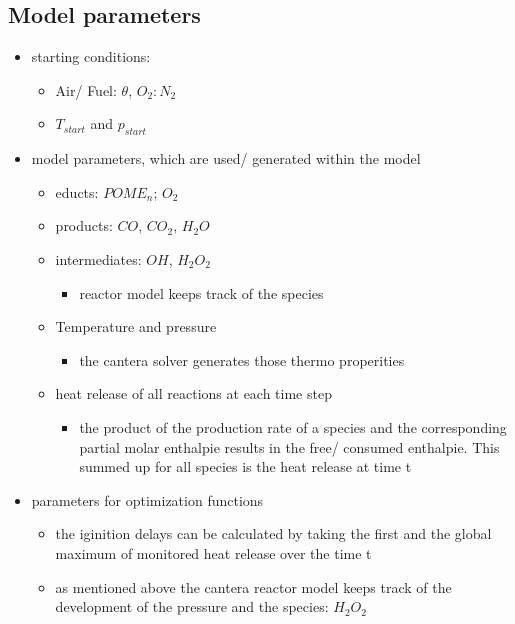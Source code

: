 \documentclass[12pt,oneside,a4paper,english]{article}
\begin{document}
\subsection{Model parameters} %
\begin{itemize}
\item{starting conditions:}

	\begin{itemize}
	\item{Air/ Fuel: $\theta$, $O_2:N_2$}
	\item{$T_{start}$ and $p_{start}$}
	\end{itemize}

\item{model parameters, which are used/ generated within the model}

	\begin{itemize}
	\item{educts: $POME_n$; $O_2$}
	\item{products: $CO$, $CO_2$, $H_2O$}
	\item{intermediates: $OH$, $H_2O_2$}
	
			\begin{itemize}
			\item{reactor model keeps track of the species}
			\end{itemize}
			
	\item{Temperature and pressure}
	
			\begin{itemize}
		\item{the cantera solver generates those thermo properities}
		\end{itemize}
		
	\item{heat release of all reactions at each time step}
	
		\begin{itemize}
		\item{the product of the production rate of a species and the corresponding partial molar enthalpie results in the free/ consumed enthalpie. This summed up for all species is the heat release at time t}
		\end{itemize}
		
	\end{itemize}

\item{parameters for optimization functions}

	\begin{itemize}
	\item{the iginition delays can be calculated by taking the first and the global maximum of monitored heat release over the time t}
	\item{as mentioned above the cantera reactor model keeps track of the development of the pressure and the species: $H_2O_2$}
	\end{itemize}
	
\end{itemize}
\end{document}
